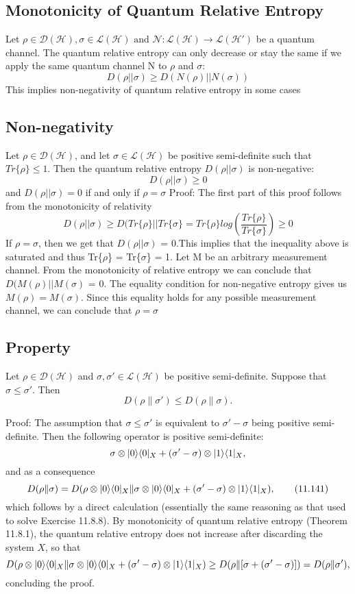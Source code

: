 \subsection{Monotonicity of Quantum Relative Entropy}
Let $\rho \in \mathcal{D}(\mathcal{H}), \sigma \in \mathcal{L}(\mathcal{H}) \text{ and } \mathcal{N}:\mathcal{L}(\mathcal{H}) \rightarrow \mathcal{L}(\mathcal{H}\prime)$ be a quantum channel. The quantum relative entropy can only decrease or stay the same if we apply the same quantum channel N to $\rho$ and $\sigma$:
\[
D(\rho||\sigma) \geq D(N(\rho)||N(\sigma))
\]
This implies non-negativity of quantum relative entropy in some cases

\subsection{Non-negativity}
Let $\rho \in \mathcal{D}(\mathcal{H})$, and let $\sigma \in \mathcal{L}(\mathcal{H})$ be positive semi-definite such that $Tr\{\rho\} \leq 1$. Then the quantum relative entropy $D(\rho||\sigma)$ is non-negative:
\[
D(\rho||\sigma) \geq 0
\]
and $D(\rho||\sigma) = 0$ if and only if $\rho = \sigma$
\newline
\newline
Proof:
The first part of this proof follows from the monotonicity of relativity
\[
D(\rho||\sigma) \geq D(Tr\{\rho\}||Tr\{\sigma\} = Tr\{\rho\}log\left(\frac{Tr\{\rho\}}{Tr\{\sigma\}}\right) \geq 0
\]
If $\rho = \sigma$, then we get that $D(\rho||\sigma)$ = 0.This implies that the inequality above is saturated and thus Tr\{$\rho$\} = Tr\{$\sigma$\} = 1. Let M be an arbitrary measurement channel. From the monotonicity of relative entropy we can conclude that $D(M(\rho)||M(\sigma)$ = 0. The equality condition for non-negative entropy gives us $M(\rho) = M(\sigma)$. Since this equality holds for any possible measurement channel, we can conclude that $\rho = \sigma$
\newline

\subsection{Property}
Let $\rho \in \mathcal{D}(\mathcal{H})$ and $\sigma, \sigma' \in \mathcal{L}(\mathcal{H})$ be positive semi-definite. Suppose that $\sigma \leq \sigma'$. Then
\[
D(\rho \| \sigma') \leq D(\rho \| \sigma).
\]


Proof:
The assumption that $\sigma \leq \sigma'$ is equivalent to $\sigma' - \sigma$ being positive semi-definite. Then the following operator is positive semi-definite: 
\[
\sigma \otimes \lvert0\rangle\langle0\rvert_X + (\sigma' - \sigma) \otimes \lvert1\rangle\langle1\rvert_X,
\]
and as a consequence
\[
D(\rho \| \sigma) = D(\rho \otimes \lvert0\rangle\langle0\rvert_X \| \sigma \otimes \lvert0\rangle\langle0\rvert_X + (\sigma' - \sigma) \otimes \lvert1\rangle\langle1\rvert_X), \tag{11.141}
\]
which follows by a direct calculation (essentially the same reasoning as that used to solve Exercise 11.8.8). By monotonicity of quantum relative entropy (Theorem 11.8.1), the quantum relative entropy does not increase after discarding the system $X$, so that
\[
D(\rho \otimes \lvert0\rangle\langle0\rvert_X \| \sigma \otimes \lvert0\rangle\langle0\rvert_X + (\sigma' - \sigma) \otimes \lvert1\rangle\langle1\rvert_X)
\geq D(\rho \| [\sigma + (\sigma' - \sigma)]) = D(\rho \| \sigma'),
\]
concluding the proof.
